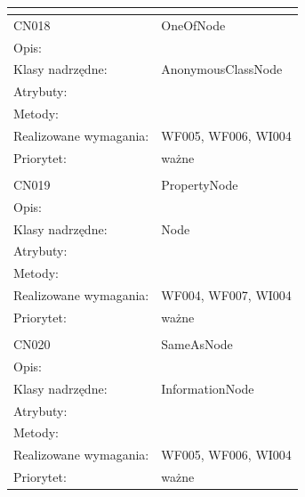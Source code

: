 \documentclass[a4paper,10pt]{article}
\begin{document}
\begin{center}
\begin{longtable}{|m{3cm}|m{9cm}|}
\multicolumn{2}{c}{} \\
 \hline

CN018 & OneOfNode \\ \hline
Opis: &     \\ \hline
Klasy nadrzędne: & AnonymousClassNode     \\ \hline
Atrybuty: & %
 \\ \hline
Metody: & %
  \\ \hline
Realizowane wymagania: & WF005, WF006, WI004 \\ \hline
Priorytet: & ważne  \\ \hline

\multicolumn{2}{c}{} \\
 \hline

CN019 & PropertyNode \\ \hline
Opis: &     \\ \hline
Klasy nadrzędne: & Node     \\ \hline
Atrybuty: & %
 \\ \hline
Metody: & %
  \\ \hline
Realizowane wymagania: & WF004, WF007, WI004 \\ \hline
Priorytet: & ważne  \\ \hline

\multicolumn{2}{c}{} \\
 \hline

CN020 & SameAsNode \\ \hline
Opis: &     \\ \hline
Klasy nadrzędne: & InformationNode     \\ \hline
Atrybuty: & %
 \\ \hline
Metody: & %
  \\ \hline
Realizowane wymagania: & WF005, WF006, WI004 \\ \hline
Priorytet: & ważne  \\ \hline


\end{longtable}
\end{center}
\end{document}
